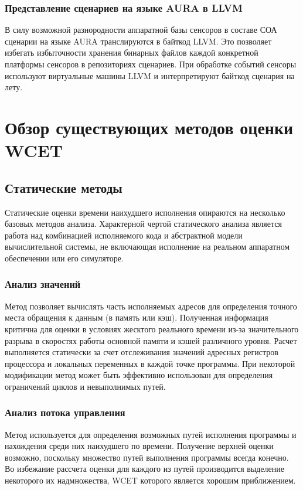 \documentclass[12pt,a4paper]{article}
\begin{document}
\subsubsection{Представление сценариев на языке AURA в LLVM}
В силу возможной разнородности аппаратной базы сенсоров в составе СОА сценарии на языке AURA транслируются в байткод LLVM. Это позволяет избегать избыточности хранения бинарных файлов каждой конкретной платформы сенсоров в репозиториях сценариев. При обработке событий сенсоры используют виртуальные машины LLVM и интерпретируют байткод сценария на лету.

\newpage
\section{Обзор существующих методов оценки WCET}

\subsection{Статические методы}
Статические оценки времени наихудшего исполнения опираются на несколько базовых методов анализа. Характерной чертой статического анализа является работа над комбинацией исполняемого кода и абстрактной модели вычислительной системы, не включающая исполнение на реальном аппаратном обеспечении или его симуляторе.

\subsubsection{Анализ значений}
Метод позволяет вычислять часть исполняемых адресов для определения точного места обращения к данным (в память или кэш). Полученная информация критична для оценки в условиях жесктого реального времени из-за значительного разрыва в скоростях работы основной памяти и кэшей различного уровня. Расчет выполняется статически за счет отслеживания значений адресных регистров процессора и локальных переменных в каждой точке программы. При некоторой модификации метод может быть эффективно использован для определения ограничений циклов и невыполнимых путей.

\subsubsection{Анализ потока управления}
Метод используется для определения возможных путей исполнения программы и нахождения среди них наихудшего по времени. Получение верхней оценки возможно, поскольку множество путей выполнения программы всегда конечно. Во избежание рассчета оценки для каждого из путей производится выделение некоторого их надмножества, WCET которого является хорошим приближением.
\end{document}
